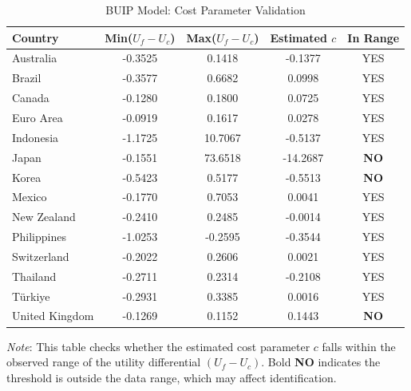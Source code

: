 \begin{table}[htbp]
\centering
\caption{BUIP Model: Cost Parameter Validation}
\label{tab:buip_threshold_validation}
\begin{tabular}{lcccc}
\toprule
Country & Min($U_f - U_c$) & Max($U_f - U_c$) & Estimated $c$ & In Range \\
\midrule
Australia & -0.3525 & 0.1418 & -0.1377 & YES \\
Brazil & -0.3577 & 0.6682 & 0.0998 & YES \\
Canada & -0.1280 & 0.1800 & 0.0725 & YES \\
Euro Area & -0.0919 & 0.1617 & 0.0278 & YES \\
Indonesia & -1.1725 & 10.7067 & -0.5137 & YES \\
Japan & -0.1551 & 73.6518 & -14.2687 & \textbf{NO} \\
Korea & -0.5423 & 0.5177 & -0.5513 & \textbf{NO} \\
Mexico & -0.1770 & 0.7053 & 0.0041 & YES \\
New Zealand & -0.2410 & 0.2485 & -0.0014 & YES \\
Philippines & -1.0253 & -0.2595 & -0.3544 & YES \\
Switzerland & -0.2022 & 0.2606 & 0.0021 & YES \\
Thailand & -0.2711 & 0.2314 & -0.2108 & YES \\
Türkiye & -0.2931 & 0.3385 & 0.0016 & YES \\
United Kingdom & -0.1269 & 0.1152 & 0.1443 & \textbf{NO} \\
\bottomrule
\end{tabular}
\begin{tablenotes}
\small
\textit{Note}: This table checks whether the estimated cost parameter $c$ falls within the 
observed range of the utility differential $(U_f - U_c)$. 
Bold \textbf{NO} indicates the threshold is outside the data range, which may affect identification.
\end{tablenotes}
\end{table}
